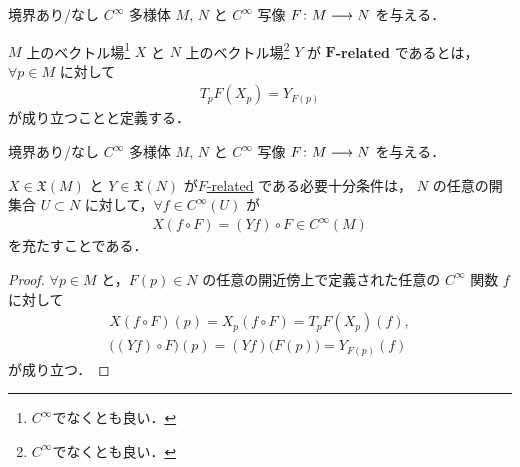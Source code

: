 \documentclass[TQFT_main]{subfiles}
\begin{document}
\begin{mydef}[label=def:F-related]{}
    境界あり/なし $C^\infty$ 多様体 $M,\, N$ と $C^\infty$ 写像 $F \colon M \longrightarrow N$ を与える．

    $M$ 上のベクトル場\footnote{\hyperref[def:vecf]{$C^\infty$}でなくとも良い．} $X$ と $N$ 上のベクトル場\footnote{\hyperref[def:vecf]{$C^\infty$}でなくとも良い．} $Y$ が $\bm{F}$\textbf{-related} であるとは，
    $\forall p \in M$ に対して
    \begin{align}
        T_p F (X_p) = Y_{F(p)}
    \end{align}
    が成り立つことと定義する．
\end{mydef}


\begin{myprop}[label=prop:F-related]{}
    境界あり/なし $C^\infty$ 多様体 $M,\, N$ と $C^\infty$ 写像 $F \colon M \longrightarrow N$ を与える．

    $X \in \mathfrak{X}(M)$ と $Y \in \mathfrak{X}(N)$ が\hyperref[def:F-related]{$F$-related} である必要十分条件は，
    $N$ の任意の開集合 $U \subset N$ に対して，$\forall f \in C^\infty (U)$ が
    \begin{align}
        X(f \circ F) = (Y f) \circ F \in C^\infty (M)
    \end{align}
    を充たすことである．
\end{myprop}

\begin{proof}
    $\forall p \in M$ と，$F(p) \in N$ の任意の開近傍上で定義された任意の $C^\infty$ 関数 $f$ に対して
    \begin{align}
        X(f \circ F)(p) = X_p (f \circ F) = T_p F (X_p) (f), \\
        \bigl((Yf) \circ F\bigr)(p) = (Yf) \bigl( F(p) \bigr) = Y_{F(p)} (f)
    \end{align}
    が成り立つ．
\end{proof}
\end{document}
